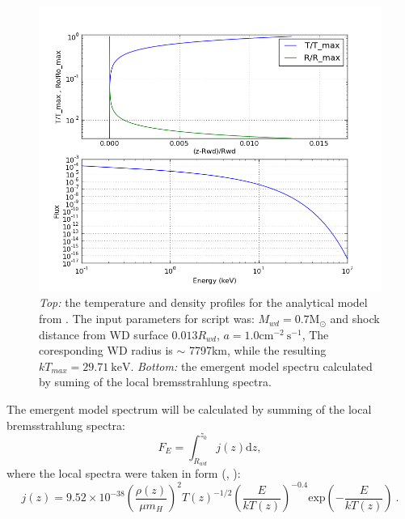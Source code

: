 \documentclass[oneside,a4paper,11pt]{report}
\begin{document}
\begin{figure}[hbt]
\centering
\includegraphics[totalheight=10cm]{model/image}
\caption{\textit{Top:} the temperature and density profiles for the analytical model from \citet{accpower:1}. The input 
parameters for script was: $M_{wd} = 0.7\mathrm{M_\odot}$ and shock distance from WD 
surface $0.013 R_{wd}$, $a = 1.0 \mathrm{cm^{-2}\:s^{-1}}$, The coresponding WD radius is $\sim$ 7797km, while the 
resulting $kT_{max} = 29.71\mathrm{\:keV}$.
\textit{Bottom:} the emergent model spectru calculated by suming of the local bremsstrahlung spectra.}
\label{koc_mod} 
\end{figure}

The emergent model spectrum will be calculated by summing of the local bremsstrahlung spectra:
\begin{equation}
 \label{int_spec1}
F_E = \int_{R_{wd}}^{z_0}j(z)\mathrm{d}z,
\end{equation}
where the local spectra were taken in form (\citet{zomb}, \citet{2005A&A...435..191S}): 
\begin{equation}
 \label{loc_spec_zom}
j(z) = 9.52\times 10^{-38} \left( \frac{\rho (z)}{\mu m_H}\right)^2 T(z)^{-1/2} \left(\frac{E}{kT(z)} \right)^{-0.4} \mathrm{exp}\left(-\frac{E}{kT(z)} \right) \:.
\end{equation}
\end{document}
